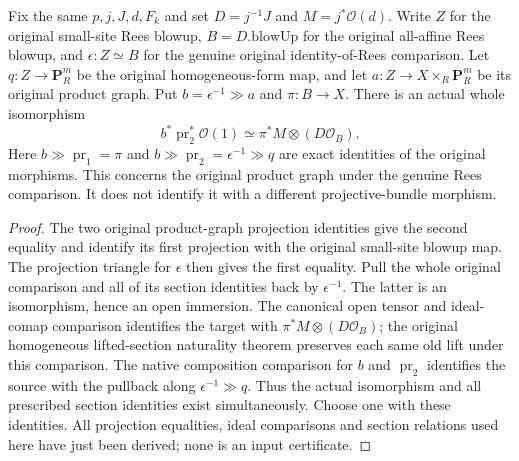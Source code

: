 \begin{definition}
\label{def:whole-original-native-product-line-comparison}
\leanok
{}
Fix the same $p,j,J,d,F_k$ and set $D=j^{-1}J$ and
$M=j^*\mathcal O(d)$. Write $Z$ for the original small-site Rees blowup,
$B=D.\mathrm{blowUp}$ for the original all-affine Rees blowup, and
$\epsilon:Z\simeq B$ for the genuine original identity-of-Rees comparison.
Let $q:Z\to\mathbf P^m_R$ be the original homogeneous-form map, and let
$a:Z\to X\times_R\mathbf P^m_R$ be its original product graph. Put
$b=\epsilon^{-1}\mathbin{\gg}a$ and $\pi:B\to X$.
There is an actual whole isomorphism
\[
 b^*\operatorname{pr}_2^*\mathcal O(1)
 \simeq \pi^*M\otimes(D\mathcal O_B).
\]
Here $b\mathbin{\gg}\operatorname{pr}_1=\pi$ and
$b\mathbin{\gg}\operatorname{pr}_2=\epsilon^{-1}\mathbin{\gg}q$ are exact
identities of the original morphisms. This concerns the original product graph
under the genuine Rees comparison. It does not identify it with a different
projective-bundle morphism.
\end{definition}
\begin{proof}
The two original product-graph projection identities give the second equality
and identify its first projection with the original small-site blowup map.
The projection triangle for $\epsilon$ then gives the first equality.
Pull the whole original comparison and all of its section identities back by
$\epsilon^{-1}$. The latter is an isomorphism, hence an open immersion.
The canonical open tensor and ideal-comap comparison identifies the target
with $\pi^*M\otimes(D\mathcal O_B)$; the original homogeneous lifted-section
naturality theorem preserves each same old lift under this comparison.
The native composition comparison for $b$ and $\operatorname{pr}_2$ identifies
the source with the pullback along $\epsilon^{-1}\mathbin{\gg}q$.
Thus the actual isomorphism and all prescribed section identities exist
simultaneously. Choose one with these identities. All projection equalities,
ideal comparisons and section relations used here have just been derived;
none is an input certificate.
\end{proof}


